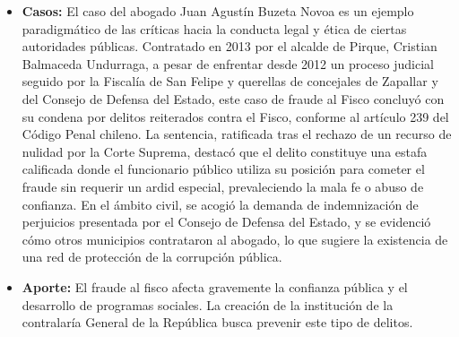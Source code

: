 \documentclass[letter,12pt]{article}
\begin{document}
\begin{itemize}
		\item \textbf{Casos: }El caso del abogado Juan Agustín Buzeta Novoa es un ejemplo paradigmático de las críticas hacia la conducta legal y ética de ciertas autoridades públicas. Contratado en 2013 por el alcalde de Pirque, Cristian Balmaceda Undurraga, a pesar de enfrentar desde 2012 un proceso judicial seguido por la Fiscalía de San Felipe y querellas de concejales de Zapallar y del Consejo de Defensa del Estado, este caso de fraude al Fisco concluyó con su condena por delitos reiterados contra el Fisco, conforme al artículo 239 del Código Penal chileno. La sentencia, ratificada tras el rechazo de un recurso de nulidad por la Corte Suprema, destacó que el delito constituye una estafa calificada donde el funcionario público utiliza su posición para cometer el fraude sin requerir un ardid especial, prevaleciendo la mala fe o abuso de confianza. En el ámbito civil, se acogió la demanda de indemnización de perjuicios presentada por el Consejo de Defensa del Estado, y se evidenció cómo otros municipios contrataron al abogado, lo que sugiere la existencia de una red de protección de la corrupción pública.\\
		
		\item \textbf{Aporte: }El fraude al fisco afecta gravemente la confianza pública y el desarrollo de programas sociales. La creación de la institución de la contralaría General de la República busca prevenir este tipo de delitos.\\
	\end{itemize}
	
\end{document}
